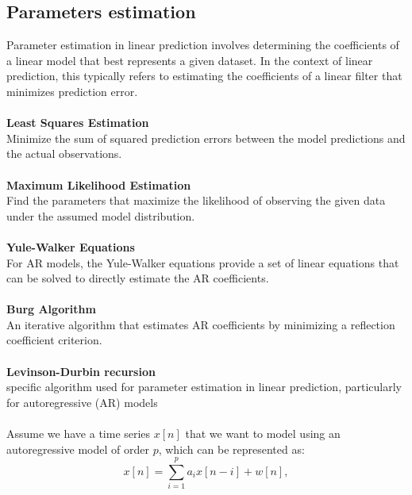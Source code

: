 \documentclass[12pt]{report}
\begin{document}
\subsection{Parameters estimation}\label{parameterslp}
Parameter estimation in linear prediction involves determining the coefficients of a linear
model that best represents a given dataset. In the context of linear prediction, this typically
refers to estimating the coefficients of a linear filter that minimizes prediction error.\\
\\
\textbf{Least Squares Estimation}\\
Minimize the sum of squared prediction errors between the model predictions and the actual
observations.\\
\\
\textbf{Maximum Likelihood Estimation}\\
Find the parameters that maximize the likelihood of observing the given data under the assumed
model distribution.\\
\\
\textbf{Yule-Walker Equations}\\
For AR models, the Yule-Walker equations provide a set of linear equations that can be solved
to directly estimate the AR coefficients.\\
\\
\textbf{Burg Algorithm}\\
An iterative algorithm that estimates AR coefficients by minimizing a reflection coefficient
criterion.\\
\\
\textbf{Levinson-Durbin recursion}\\
specific algorithm used for parameter estimation in linear prediction, particularly for
autoregressive (AR) models\\
\\
Assume we have a time series \( x[n] \) that we want to model using an autoregressive model of order \( p \), which can be represented as:
\begin{equation}
     x[n] = \sum_{i=1}^{p} a_i x[n-i] + w[n],
\end{equation}
\end{document}
